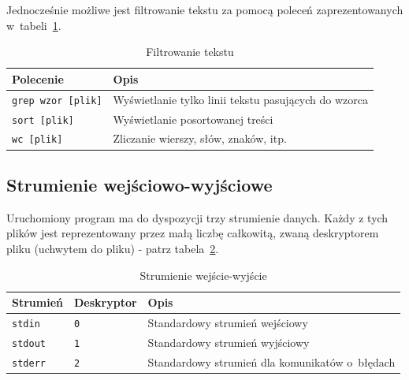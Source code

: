 Jednocześnie możliwe jest filtrowanie tekstu za pomocą poleceń zaprezentowanych w~tabeli~\ref{tab:filtruj}.

\begin{table}[h!]
\centering
\caption{Filtrowanie tekstu}
\setlength{\arrayrulewidth}{1pt}
\setlength{\tabcolsep}{6pt}
\renewcommand{\arraystretch}{1.2}
\begin{tabular}{ |p{}|p{}|}
\hline \rowcolor{gray}
\textbf{Polecenie} & \textbf{Opis} \\ \hline
\mbox{\lstinline[style=MyBashStyle]{grep wzor [plik]}} & Wyświetlanie tylko linii tekstu pasujących do wzorca \\ \hline 
\mbox{\lstinline[style=MyBashStyle]{sort [plik]}} & Wyświetlanie posortowanej treści \\ \hline 
\mbox{\lstinline[style=MyBashStyle]{wc [plik]}} & Zliczanie wierszy, słów, znaków, itp. \\ \hline 
\end{tabular}
\label{tab:filtruj}
\end{table}

\subsection{Strumienie wejściowo-wyjściowe}

Uruchomiony program ma do dyspozycji trzy strumienie danych. Każdy z tych plików jest reprezentowany przez małą liczbę całkowitą, zwaną deskryptorem pliku (uchwytem do pliku) - patrz tabela~\ref{tab:strumienie}. 

\begin{table}[h!]
\centering
\caption{Strumienie wejście-wyjście}
\setlength{\arrayrulewidth}{1pt}
\setlength{\tabcolsep}{6pt}
\renewcommand{\arraystretch}{1.2}
\begin{tabular}{ |p{}|p{}|p{}|}
\hline \rowcolor{gray}
\textbf{Strumień} & \textbf{Deskryptor} & \textbf{Opis} \\ \hline
\mbox{\lstinline[style=MyBashStyle]{stdin}} & \mbox{\lstinline[style=MyBashStyle]{0}} &  Standardowy strumień wejściowy  \\ \hline 
\mbox{\lstinline[style=MyBashStyle]{stdout}} & \mbox{\lstinline[style=MyBashStyle]{1}} &  Standardowy strumień wyjściowy  \\ \hline 
\mbox{\lstinline[style=MyBashStyle]{stderr}} & \mbox{\lstinline[style=MyBashStyle]{2}} &  Standardowy strumień dla komunikatów o~błędach  \\ \hline 
\end{tabular}
\label{tab:strumienie}
\end{table}

